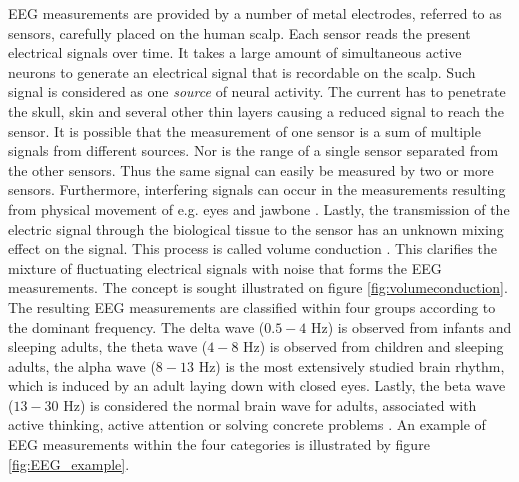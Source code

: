 EEG measurements are provided by a number of metal electrodes, referred to as sensors, carefully placed on the human scalp. 
Each sensor reads the present electrical signals over time.
It takes a large amount of simultaneous active neurons to generate an electrical signal that is recordable on the scalp. Such signal is considered as one \textit{ source} of neural activity. 
The current has to penetrate the skull, skin and several other thin layers causing a reduced signal to reach the sensor.
It is possible that the measurement of one sensor is a sum of multiple signals from different sources.
Nor is the range of a single sensor separated from the other sensors. Thus the same signal can easily be measured by two or more sensors.
Furthermore, interfering signals can occur in the measurements resulting from physical movement of e.g. eyes and jawbone \cite{fundamentalEEG}. 
Lastly, the transmission of the electric signal through the biological tissue to the sensor has an unknown mixing effect on the signal. This process is called volume conduction \cite[p. 68]{EEGsignalprocessing} \cite{Van2019}.
This clarifies the mixture of fluctuating electrical signals with noise that forms the EEG measurements. 
The concept is sought illustrated on figure \ref{fig:volumeconduction}. 
The resulting EEG measurements are classified within four groups according to the dominant frequency. 
The delta wave ($0.5-4$ Hz) is observed from infants and sleeping adults, the theta wave ($4-8$ Hz) is observed from children and sleeping adults, the alpha wave ($8-13$ Hz) is the most extensively studied brain rhythm, which is induced by an adult laying down with closed eyes. 
Lastly, the beta wave ($13-30$ Hz) is considered the normal brain wave for adults, associated with active thinking, active attention or solving concrete problems \cite[p. 11]{EEGsignalprocessing}. 
An example of EEG measurements within the four categories is illustrated by figure \ref{fig:EEG_example}.
